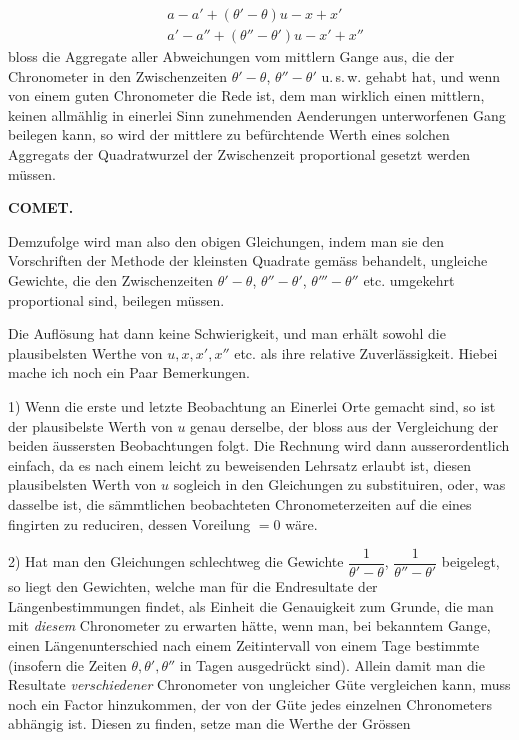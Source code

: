 \[
\begin{aligned}
&a-a'+(\theta'-\theta)u-x+x'\\
&a'-a''+(\theta''-\theta')u-x'+x''
\end{aligned}
\]
\noindent bloss die Aggregate aller Abweichungen vom mittlern Gange aus, die der Chronometer in
den Zwischenzeiten $\theta'-\theta$, $\theta''-\theta'$ u.\,s.\,w. gehabt hat, und wenn von einem guten
Chronometer die Rede ist, dem man wirklich einen mittlern, keinen allmählig in einerlei
Sinn zunehmenden Aenderungen unterworfenen Gang beilegen kann, so wird der
mittlere zu befürchtende Werth eines solchen Aggregats der Quadratwurzel der
Zwischenzeit proportional gesetzt werden müssen.

\clearpage
\thispagestyle{empty}
\noindent{}%
%
\parbox[t]{\dimexpr\linewidth-24mm\relax}{\centering\footnotesize\bfseries COMET.\par}%
\makebox[12mm][r]{}\par\nobreak\medskip
Demzufolge wird man also den obigen Gleichungen, indem man sie den Vorschriften der
Methode der kleinsten Quadrate gemäss behandelt, ungleiche Gewichte, die den
Zwischenzeiten $\theta'-\theta$, $\theta''-\theta'$, $\theta'''-\theta''$ etc. umgekehrt proportional sind,
beilegen müssen.

Die Auflösung hat dann keine Schwierigkeit, und man erhält sowohl die plausibelsten
Werthe von $u, x, x', x''$ etc. als ihre relative Zuverlässigkeit. Hiebei mache ich noch ein
Paar Bemerkungen.

1) Wenn die erste und letzte Beobachtung an Einerlei Orte gemacht sind, so ist der
plausibelste Werth von $u$ genau derselbe, der bloss aus der Vergleichung der beiden
äussersten Beobachtungen folgt. Die Rechnung wird dann ausserordentlich einfach, da es
nach einem leicht zu beweisenden Lehrsatz erlaubt ist, diesen plausibelsten Werth von
$u$ sogleich in den Gleichungen zu substituiren, oder, was dasselbe ist, die sämmtlichen
beobachteten Chronometerzeiten auf die eines fingirten zu reduciren, dessen Voreilung
$=0$ wäre.

2) Hat man den Gleichungen schlechtweg die Gewichte $\dfrac{1}{\theta'-\theta}$, $\dfrac{1}{\theta''-\theta'}$
beigelegt, so liegt den Gewichten, welche man für die Endresultate der
Längenbestimmungen findet, als Einheit die Genauigkeit zum Grunde, die man mit
\emph{diesem} Chronometer zu erwarten hätte, wenn man, bei bekanntem Gange, einen
Längenunterschied nach einem Zeitintervall von einem Tage bestimmte (insofern die
Zeiten $\theta, \theta', \theta''$ in Tagen ausgedrückt sind). Allein damit man die Resultate
\emph{verschiedener} Chronometer von ungleicher Güte vergleichen kann, muss noch ein
Factor hinzukommen, der von der Güte jedes einzelnen Chronometers abhängig ist.
Diesen zu finden, setze man die Werthe der Grössen

